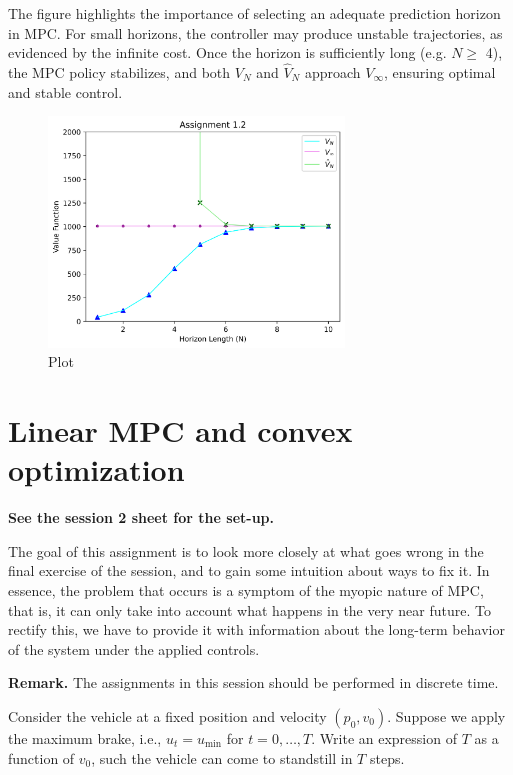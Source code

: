 \documentclass[]{article}
\begin{document}
The figure highlights the importance of selecting an adequate prediction horizon in MPC. For small horizons, the controller may produce unstable trajectories, as evidenced by the infinite cost. Once the horizon is sufficiently long (e.g. $N \geq$ 4), the MPC policy stabilizes, and both $V_N$ and $\hat{V}_N$ approach $V_\infty$, ensuring optimal and stable control.
\begin{figure}[H]
    \centering
    \includegraphics[width=0.7\textwidth]{images/Assignment_12.png}
    \caption{Plot}
    \label{fig:assignment1_2}
\end{figure}



\newpage
\section{Linear MPC and convex optimization}
\textbf{See the session 2 sheet for the set-up.}

The goal of this assignment is to look more closely at what goes wrong in the 
final exercise of the session, and to gain some intuition about ways to fix it.
In essence, the problem that occurs is a symptom of the myopic nature of MPC,
that is, it can only take into account what happens in the very near future.
To rectify this, we have to provide it with information about the long-term
behavior of the system under the applied controls.

\textbf{Remark.} The assignments in this session should be performed in discrete time.

\begin{assignment}
	Consider the vehicle at a fixed position and velocity $(p_0, v_0)$.
	Suppose we apply the maximum brake, i.e., $u_t = u_{\min}$ for $t = 0, \dots, T$.
	Write an expression of $T$ as a function of $v_0$, such the vehicle can come to standstill in $T$ steps.
\end{assignment}
\end{document}
